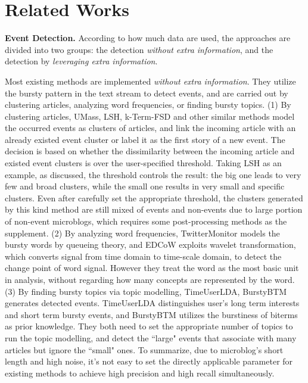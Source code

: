 \documentclass[runningheads,a4paper]{llncs}
\begin{document}
\section{Related Works}
\label{sec:relatedWorks}
\textbf{Event Detection.} According to how much data are used, the approaches are divided into two groups: the detection \textit{without extra information}, and the detection by \textit{leveraging extra information}. 

Most existing methods are implemented \textit{without extra information}.
They utilize the bursty pattern in the text stream to detect events, and are carried out by  clustering articles\cite{Allan:2000wu,Petrovic:2010uj,Wurzer:2015wq}, analyzing word frequencies\cite{Mathioudakis:2010fc,Weng:2011wz}, or finding bursty topics\cite{Diao:2012wj,Yan:2015wm}. 
(1) By clustering articles, UMass\cite{Allan:2000wu}, LSH\cite{Petrovic:2010uj}, k-Term-FSD\cite{Wurzer:2015wq} and other similar methods model the occurred events as clusters of articles, and link the incoming article with an already existed event cluster or label it as the first story of a new event.
The decision is based on whether the dissimilarity between the incoming article and existed event clusters is over the user-specified threshold. 
Taking LSH as an example, as \cite{Petrovic:2010uj} discussed, the threshold controls the result: the big one leads to very few and broad clusters, while the small one results in very small and specific clusters.
Even after carefully set the appropriate threshold, the clusters generated by this kind method are still mixed of events and non-events due to large portion of non-event microblogs, which requires some post-processing methods as the supplement. 
(2) By analyzing word frequencies, TwitterMonitor\cite{Mathioudakis:2010fc} models the bursty words by queueing theory, and EDCoW\cite{Weng:2011wz} exploits wavelet transformation, which converts signal from time domain to time-scale domain, to detect the change point of word signal. 
However they treat the word as the most basic unit in analysis, without regarding how many concepts are represented by the word.
(3) By finding bursty topics via topic modelling, TimeUserLDA\cite{Diao:2012wj}, BurstyBTM\cite{Yan:2015wm} generates detected events.
TimeUserLDA distinguishes user's long term interests and short term bursty events, and BurstyBTM utilizes the burstiness of biterms as prior knowledge.
They both need to set the appropriate number of topics to run the topic modelling, and detect the ``large" events that associate with many articles but ignore the ``small" ones. 
To summarize, due to microblog's short length and high noise, it's not easy to set the directly applicable parameter for existing methods to achieve high precision and high recall simultaneously.
\end{document}
